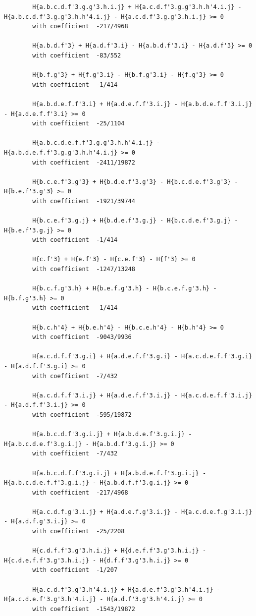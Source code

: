 \documentclass[11pt, a4paper]{kybernetika}
\begin{document}
\begin{verbatim}
		H{a.b.c.d.f'3.g.g'3.h.i.j} + H{a.c.d.f'3.g.g'3.h.h'4.i.j} - H{a.b.c.d.f'3.g.g'3.h.h'4.i.j} - H{a.c.d.f'3.g.g'3.h.i.j} >= 0
		with coefficient  -217/4968
		
		H{a.b.d.f'3} + H{a.d.f'3.i} - H{a.b.d.f'3.i} - H{a.d.f'3} >= 0
		with coefficient  -83/552
		
		H{b.f.g'3} + H{f.g'3.i} - H{b.f.g'3.i} - H{f.g'3} >= 0
		with coefficient  -1/414
		
		H{a.b.d.e.f.f'3.i} + H{a.d.e.f.f'3.i.j} - H{a.b.d.e.f.f'3.i.j} - H{a.d.e.f.f'3.i} >= 0
		with coefficient  -25/1104
		
		H{a.b.c.d.e.f.f'3.g.g'3.h.h'4.i.j} - H{a.b.d.e.f.f'3.g.g'3.h.h'4.i.j} >= 0
		with coefficient  -2411/19872
		
		H{b.c.e.f'3.g'3} + H{b.d.e.f'3.g'3} - H{b.c.d.e.f'3.g'3} - H{b.e.f'3.g'3} >= 0
		with coefficient  -1921/39744
		
		H{b.c.e.f'3.g.j} + H{b.d.e.f'3.g.j} - H{b.c.d.e.f'3.g.j} - H{b.e.f'3.g.j} >= 0
		with coefficient  -1/414
		
		H{c.f'3} + H{e.f'3} - H{c.e.f'3} - H{f'3} >= 0
		with coefficient  -1247/13248
		
		H{b.c.f.g'3.h} + H{b.e.f.g'3.h} - H{b.c.e.f.g'3.h} - H{b.f.g'3.h} >= 0
		with coefficient  -1/414
		
		H{b.c.h'4} + H{b.e.h'4} - H{b.c.e.h'4} - H{b.h'4} >= 0
		with coefficient  -9043/9936
		
		H{a.c.d.f.f'3.g.i} + H{a.d.e.f.f'3.g.i} - H{a.c.d.e.f.f'3.g.i} - H{a.d.f.f'3.g.i} >= 0
		with coefficient  -7/432
		
		H{a.c.d.f.f'3.i.j} + H{a.d.e.f.f'3.i.j} - H{a.c.d.e.f.f'3.i.j} - H{a.d.f.f'3.i.j} >= 0
		with coefficient  -595/19872
		
		H{a.b.c.d.f'3.g.i.j} + H{a.b.d.e.f'3.g.i.j} - H{a.b.c.d.e.f'3.g.i.j} - H{a.b.d.f'3.g.i.j} >= 0
		with coefficient  -7/432
		
		H{a.b.c.d.f.f'3.g.i.j} + H{a.b.d.e.f.f'3.g.i.j} - H{a.b.c.d.e.f.f'3.g.i.j} - H{a.b.d.f.f'3.g.i.j} >= 0
		with coefficient  -217/4968
		
		H{a.c.d.f.g'3.i.j} + H{a.d.e.f.g'3.i.j} - H{a.c.d.e.f.g'3.i.j} - H{a.d.f.g'3.i.j} >= 0
		with coefficient  -25/2208
		
		H{c.d.f.f'3.g'3.h.i.j} + H{d.e.f.f'3.g'3.h.i.j} - H{c.d.e.f.f'3.g'3.h.i.j} - H{d.f.f'3.g'3.h.i.j} >= 0
		with coefficient  -1/207
		
		H{a.c.d.f'3.g'3.h'4.i.j} + H{a.d.e.f'3.g'3.h'4.i.j} - H{a.c.d.e.f'3.g'3.h'4.i.j} - H{a.d.f'3.g'3.h'4.i.j} >= 0
		with coefficient  -1543/19872
		

\end{verbatim}
\end{document}
